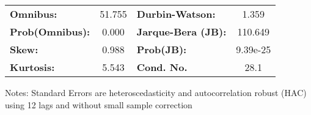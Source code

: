 \begin{center}
\begin{tabular}{lcccccc}
\bottomrule
\end{tabular}
\begin{tabular}{lclc}
\textbf{Omnibus:}       & 51.755 & \textbf{  Durbin-Watson:     } &    1.359  \\
\textbf{Prob(Omnibus):} &  0.000 & \textbf{  Jarque-Bera (JB):  } &  110.649  \\
\textbf{Skew:}          &  0.988 & \textbf{  Prob(JB):          } & 9.39e-25  \\
\textbf{Kurtosis:}      &  5.543 & \textbf{  Cond. No.          } &     28.1  \\
\bottomrule
\end{tabular}
\end{center}

Notes: \newline
 [1] Standard Errors are heteroscedasticity and autocorrelation robust (HAC) using 12 lags and without small sample correction
